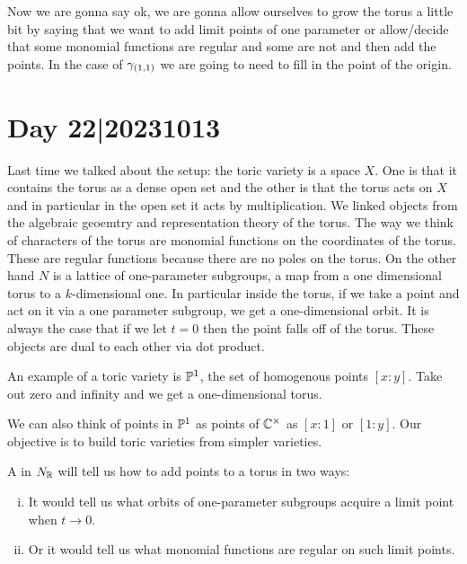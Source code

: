 \documentclass[12pt]{memoir}
\begin{document}
Now we are gonna say ok, we are gonna allow ourselves to grow the torus a little bit by saying that we want to add limit points of one parameter or allow/decide that some monomial functions are regular and some are not and then add the points. In the case of $\gamma_{(1,1)}$ we are going to need to fill in the point of the origin. 

\section{Day 22|20231013}

Last time we talked about the setup: the toric variety is a space $X$. One is that it contains the torus as a dense open set and the other is that the torus acts on $X$ and in particular in the open set it acts by multiplication. We linked objects from the algebraic geoemtry and representation theory of the torus. The way we think of characters of the torus are monomial functions on the coordinates of the torus. These are regular functions because there are no poles on the torus. On the other hand $N$ is a lattice of one-parameter subgroups, a map from a one dimensional torus to a $k$-dimensional one. In particular inside the torus, if we take a point and act on it via a one parameter subgroup, we get a one-dimensional orbit. It is always the case that if we let $t=0$ then the point falls off of the torus. These objects are dual to each other via dot product.

\begin{Ex}
    An example of a toric variety is $\mathbb{P}^1$, the set of homogenous points $[x:y]$. Take out zero and infinity and we get a one-dimensional torus.\par 
    We can also think of points in $\mathbb{P}^1$ as points of $\mathbb{C}^\times$ as $[x:1]$ or $[1:y]$. Our objective is to build toric varieties from simpler varieties.
\end{Ex}

\begin{Def}
    A  in $N_{\mathbb{R}}$ will tell us how to add points to a torus in two ways:
    \begin{enumerate}[i)]
        \item It would tell us what orbits of one-parameter subgroups acquire a limit point when $t\to 0$.
        \item Or it would tell us what monomial functions are regular on such limit points. 
    \end{enumerate}
\end{Def}
\end{document}
